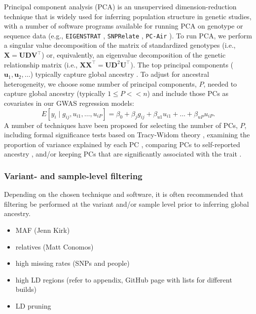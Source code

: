 \documentclass[12pt]{article}
\newcommand{\add}[1]{{\color{red}{[... #1 ...]}}}
\begin{document}
Principal component analysis (PCA) is an unsupervised dimension-reduction technique that is widely used for inferring population structure in genetic studies, with a number of software programs available for running PCA on genotype or sequence data (e.g., \texttt{EIGENSTRAT} \citep{eigenstrat}, \texttt{SNPRelate} \citep{snprelate}, \texttt{PC-Air} \citep{conomos2015}).
To run PCA, we perform a singular value decomposition of the matrix of standardized genotypes (i.e., $\mathbf{X} = \mathbf{UDV}^\top$) or, equivalently, an eigenvalue decomposition of the genetic relationship matrix (i.e., $\mathbf{XX}^\top = \mathbf{UD}^2\mathbf{U}^\top$). 
The top principal components ($\mathbf{u}_1, \mathbf{u}_2, \dots$) typically capture global ancestry \citep{patterson2006, mcvean2009}. 
To adjust for ancestral heterogeneity, we choose some number of principal components, $P$, needed to capture global ancestry (typically $1 \le P << n$) and include those PCs as covariates in our GWAS regression models: $$E[y_i \mid g_{ij}, u_{i1}, \dots, u_{iP}] = \beta_0 + \beta_j g_{ij} + \beta_{u 1} u_{i1} + \dots + \beta_{u P} u_{i P}.$$
A number of techniques have been proposed for selecting the number of PCs, $P$, including formal significance tests based on Tracy-Widom theory \citep{patterson2006, eigenstrat}, examining the proportion of variance explained by each PC \citep{reed2015}, comparing PCs to self-reported ancestry \citep{conomos2016}, and/or keeping PCs that are significantly associated with the trait \citep{reiner2012, daya2019}. 
\add{Mention that many people will include more than necessary?}

\subsubsection{Variant- and sample-level filtering}

Depending on the chosen technique and software, it is often recommended that filtering be performed at the variant and/or sample level prior to inferring global ancestry.

\begin{itemize}
\item MAF (Jenn Kirk)
\item relatives (Matt Conomos)
\item high missing rates (SNPs and people)
\item high LD regions (refer to appendix, GitHub page with lists for different builds)
\item LD pruning
\end{itemize}
\end{document}
